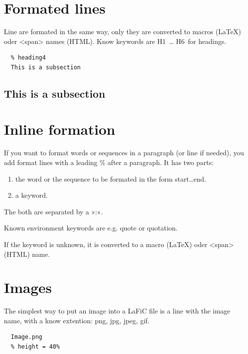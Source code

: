 \documentclass{article}
\begin{document}
\section{Formated lines}

Line are formated in the same way, only they are converted
to macros (\LaTeX) oder <span> names (HTML). Know keywords
are H1~… H6~for headings.

\begin{verbatim}
  % heading4
  This is a subsection

\end{verbatim}

\subsection{This is a subsection}

\section{Inline formation}

If you want to format words or sequences in a paragraph (or
line if needed), you add format lines with a leading \% after
a paragraph. It has two parts:

\begin{enumerate}

\item the word or the sequence to be formated in the form
  start…end. 
\item a keyword.

\end{enumerate}

The both are separated by a »:«.

Known environment keywords are e.g. quote or quotation.

If the keyword is unknown, it is converted to a macro
(\LaTeX) oder <span> (HTML) name.

\section{Images}

The simplest way to put an image into a LaFiC file is a
line with the image name, with a know extention: png, jpg,
jpeg, gif.

\begin{verbatim}
  Image.png
  % height = 40%

\end{verbatim}
\end{document}
